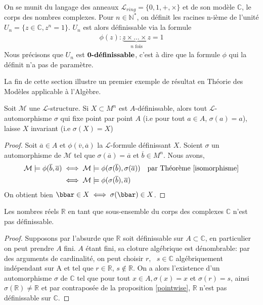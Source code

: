 \begin{exem}
On se munit du langage des anneaux $\mathcal{L}_{ring} = \{0, 1, +, \times\}$ et de son modèle $\mathbb{C}$, le corps des nombres complexes.
Pour $n \in \mathbb{N}^*$, on définit les racines n-ième de l'unité $U_n = \{z \in \mathbb{C}, z^n = 1 \}$.
$U_n$ est alors définissable via la formule 
\begin{align*}
\phi(z): \underbrace{z \times \dots \times z}_{n \text{ fois}} = 1
\end{align*}
Nous précisons que $U_n$ est $\textbf{0-définissable}$, c'est à dire que la formule $\phi$ qui la définit n'a pas de paramètre.
\end{exem}

La fin de cette section illustre un premier exemple de résultat en Théorie des Modèles applicable à l'Algèbre.

\begin{prop}\label{pointwise}
Soit $\mathcal{M}$ une $\mathcal{L}$-structure. Si $X \subset M^n$ est $A$-définissable, alors tout $\mathcal{L}$-automorphisme $\sigma$
qui fixe point par point $A$ (i.e pour tout $a \in A$, $\sigma(a) = a$), laisse $X$ invariant (i.e $\sigma(X)=X$)
\end{prop}

\begin{proof}
Soit $\overline{a} \in A$ et $\phi(\overline{v}, \overline{a})$ la $\mathcal{L}$-formule définissant $X$.
Soient $\sigma$ un automorphisme de $\mathcal{M}$ tel que $\sigma(\overline{a}) = \overline{a}$ et $\overline{b} \in M^n$.
Nous avons, 
\begin{align*}
\mathcal{M} \models \phi(\overline{b}, \overline{a}) &\iff \mathcal{M} \models \phi(\sigma(\overline{b}), \sigma(\overline{a})) 
&& \text{par Théorème } \ref{isomorphisme}\\
&\iff \mathcal{M} \models \phi(\sigma(\overline{b}), \overline{a})
\end{align*}
On obtient bien $\bbar \in X \iff \sigma(\bbar) \in X$.
\end{proof}

\begin{coro}
Les nombres réels $\mathbb{R}$ en tant que sous-ensemble du corps des complexes $\mathbb{C}$ n'est pas définissable.
\end{coro}

\begin{proof}
Supposons par l'absurde que $\mathbb{R}$ soit définissable sur $A \subset \mathbb{C}$, en particulier on peut prendre $A$ fini.
$A$ étant fini, sa cloture algébrique est dénombrable: par des arguments de cardinalité, on peut choisir $r,\text{ }s \in \mathbb{C}$ 
algébriquement indépendant sur A et tel que $r \in \mathbb{R}$, $s \not\in \mathbb{R}$.
On a alors l'existence d'un automorphisme $\sigma$ de $\mathbb{C}$ tel que pour tout $x \in A, \sigma(x)=x$ et $\sigma(r)=s$,
ainsi $\sigma(\mathbb{R}) \neq \mathbb{R}$ et par contraposée de la proposition \ref{pointwise}, $\mathbb{R}$ n'est pas définissable sur $\mathbb{C}$.
\end{proof}


